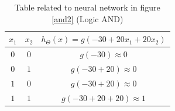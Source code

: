 \begin{mdframed}[style=MyFrame]
\begin{table}[H]
\caption{Table related to neural network in figure \ref{and2} (Logic AND) }
\centering
\begin{tabular}{c c c }
\hline\hline
$x_1$	&	$x_2$ & $h_{\Theta}(x) = g(-30 + 20x_1 + 20x_2 ) $ \\ [0.5ex] %
\hline
$0$ &	$0$	& $g(-30) \approx 0$ \\
$0$ &	$1$	& $g(-30 + 20) \approx 0$ \\
$1$ &	$0$	& $g(-30 + 20) \approx 0$ \\
$1$ &	$1$	& $g(-30 + 20 +20) \approx 1$ \\
\hline
\end{tabular}
\label{table:nov-ser}
\end{table}
\end{mdframed}


